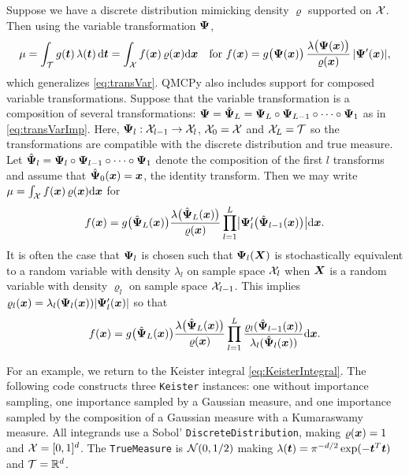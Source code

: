 \documentclass[graybox,footinfo]{svmult}
\begin{document}
Suppose we have a discrete distribution mimicking  density $\varrho$ supported on ${\mathcal{X}}$.  Then using the variable transformation ${\boldsymbol{\Psi}}$, 
\begin{equation*}
	\mu = \int_{\mathcal{T}} g({\boldsymbol{t}}) \, \lambda({\boldsymbol{t}}) \, \mathrm{d} {\boldsymbol{t}}  =  \int_{{\mathcal{X}}}f({\boldsymbol{x}}) \, \varrho({\boldsymbol{x}}) \mathrm{d} {\boldsymbol{x}} \quad \text{for }
   f({\boldsymbol{x}})  = g\bigl({\boldsymbol{\Psi}}({\boldsymbol{x}})\bigr)  \, \frac{\lambda\bigl({\boldsymbol{\Psi}}({\boldsymbol{x}})\bigr)}{\varrho({\boldsymbol{x}})} \, \lvert {\boldsymbol{\Psi}}'({\boldsymbol{x}})\rvert,
\end{equation*}
which generalizes \eqref{eq:transVar}.
QMCPy also includes support for composed variable transformations. Suppose that the variable transformation is a composition of several transformations: ${\boldsymbol{\Psi}}=\hat{{\boldsymbol{\Psi}}}_L = {\boldsymbol{\Psi}}_L \circ {\boldsymbol{\Psi}}_{L-1} \circ \dots \circ {\boldsymbol{\Psi}}_1$ as in \eqref{eq:transVarImp}. Here, ${\boldsymbol{\Psi}}_l:{\mathcal{X}}_{l-1} \to {\mathcal{X}}_l$,  ${\mathcal{X}}_0={\mathcal{X}}$ and ${\mathcal{X}}_L={\mathcal{T}}$ so the transformations are compatible with the discrete distribution and true measure. Let $\hat{{\boldsymbol{\Psi}}}_l={\boldsymbol{\Psi}}_l \circ {\boldsymbol{\Psi}}_{l-1} \circ \dots \circ {\boldsymbol{\Psi}}_1$ denote the composition of the first $l$ transforms and assume that $\hat{{\boldsymbol{\Psi}}}_0({\boldsymbol{x}})={\boldsymbol{x}}$, the identity transform. Then we may write $\mu =  \int_{{\mathcal{X}}}f({\boldsymbol{x}}) \, \varrho({\boldsymbol{x}}) \mathrm{d} {\boldsymbol{x}}$ for 
\begin{equation*}
    f({\boldsymbol{x}}) 
 = g\bigl(\hat{{\boldsymbol{\Psi}}}_L({\boldsymbol{x}})\bigr)\frac{\lambda\bigl(\hat{{\boldsymbol{\Psi}}}_L({\boldsymbol{x}})\bigr)}{\varrho({\boldsymbol{x}})}\prod_{l=1}^L \bigl\lvert {\boldsymbol{\Psi}}_l'\bigl(\hat{{\boldsymbol{\Psi}}}_{l-1}({\boldsymbol{x}})\bigr) \bigr\rvert \mathrm{d} {\boldsymbol{x}} .
\end{equation*}
It is often the case that ${\boldsymbol{\Psi}}_l$ is chosen such that ${\boldsymbol{\Psi}}_l({\boldsymbol{X}})$ is stochastically equivalent to a random variable with density $\lambda_l$ on sample space ${\mathcal{X}}_l$ when ${\boldsymbol{X}}$ is a random variable with density $\varrho_l$ on sample space ${\mathcal{X}}_{l-1}$.  This implies  $\varrho_l({\boldsymbol{x}}) = \lambda_l({\boldsymbol{\Psi}}_l({\boldsymbol{x}}))\lvert  {\boldsymbol{\Psi}}'_l ({\boldsymbol{x}}) \rvert$ so that
\begin{equation*}
f({\boldsymbol{x}}) 
 = g\bigl(\hat{{\boldsymbol{\Psi}}}_L({\boldsymbol{x}})\bigr)\frac{\lambda\bigl(\hat{{\boldsymbol{\Psi}}}_L({\boldsymbol{x}})\bigr)}{\varrho({\boldsymbol{x}})}\prod_{l=1}^L \frac{\varrho_l(\hat{{\boldsymbol{\Psi}}}_{l-1}({\boldsymbol{x}}))}{\lambda_l(\hat{{\boldsymbol{\Psi}}}_l({\boldsymbol{x}}))} \mathrm{d} {\boldsymbol{x}}.
\end{equation*}

For an example, we return to the Keister integral \eqref{eq:KeisterIntegral}. The following code constructs three \texttt{Keister} instances: one without importance sampling, one importance sampled by a Gaussian measure, and one importance sampled by the composition of a Gaussian measure with a Kumaraswamy measure. All integrands use a Sobol' \texttt{DiscreteDistribution}, making $\varrho({\boldsymbol{x}})=1$ and ${\mathcal{X}} = [0,1]^d$. The \texttt{TrueMeasure} is ${\mathcal{N}}(0,1/2)$ making $\lambda({\boldsymbol{t}}) = \pi^{-d/2} \exp(-{\boldsymbol{t}}^T {\boldsymbol{t}})$ and ${\mathcal{T}} = {\mathbb{R}}^d$. 
\end{document}

